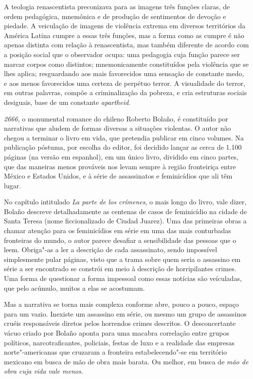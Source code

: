A teologia renascentista preconizava para as imagens três funções
claras, de ordem pedagógica, mnemônica e de produção de sentimentos de
devoção e piedade. A veiculação de imagens de violência extrema em
diversos territórios da América Latina cumpre a essas três funções, mas
a forma como as cumpre é não apenas distinta com relação à
renascentista, mas também diferente de acordo com a posição
social que o observador ocupa: uma pedagogia cuja função parece ser
marcar corpos como distintos; mnemonicamente constituídos pela violência
que se lhes aplica; resguardando aos mais favorecidos uma sensação de
constante medo, e aos menos favorecidos uma certeza de perpétuo terror.
A visualidade do terror, em outras palavras, compõe a criminalização da
pobreza, e cria estruturas sociais desiguais, base de um constante \emph{apartheid}.

\asterisc

\emph{2666}, o monumental romance do chileno Roberto Bolaño, é
constituído por narrativas que aludem de formas diversas a situações
violentas. O autor não chegou a terminar o livro em vida, que pretendia
publicar em cinco volumes. Na publicação póstuma, por escolha do editor,
foi decidido lançar as cerca de 1.100 páginas (na versão em espanhol),
em um único livro, dividido em cinco partes, que das maneiras menos
prováveis nos levam sempre à região fronteiriça entre México e Estados
Unidos, e à série de assassinatos e feminicídios que ali têm lugar.

No capítulo intitulado \emph{La parte de los crímenes}, o mais longo do
livro, vale dizer, Bolaño descreve detalhadamente as centenas de casos
de feminicídio na cidade de Santa Teresa (nome ficcionalizado de Ciudad
Juarez). Uma das primeiras obras a chamar atenção para os feminicídios
em série em uma das mais conturbadas fronteiras do mundo, o autor parece
desafiar a sensibilidade das pessoas que o leem. Obriga"-as a ler a
descrição de cada assassinato, sendo impossível simplesmente pular
páginas, visto que a trama sobre quem seria o assassino em série a ser
encontrado se constrói em meio à descrição de horripilantes crimes. Uma
forma de questionar a forma impessoal como essas notícias são
veículadas, que pelo acúmulo, muitos a elas se acostumam.

Mas a narrativa se torna mais complexa conforme abre, pouco a pouco,
espaço para um vazio. Inexiste um assassino em série, ou mesmo um grupo
de assassinos cruéis responsáveis diretos pelos horrendos crimes
descritos. O desconcertante vácuo criado por Bolaño aponta para uma
macabra correlação entre grupos políticos, narcotraficantes, policiais,
festas de luxo e a realidade das empresas norte"-americanas que cruzaram
a fronteira estabelecendo"-se em território mexicano em busca de mão de obra
mais barata. Ou melhor, em busca de \emph{mão de obra cuja vida vale
menos}.

